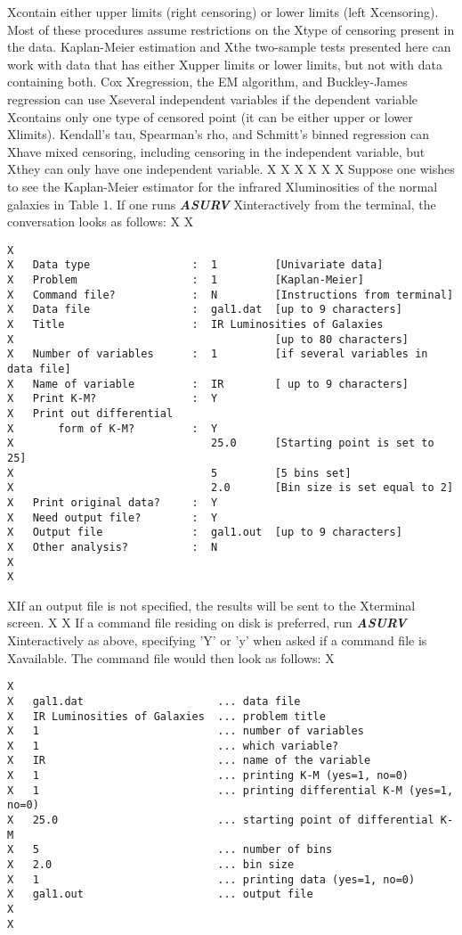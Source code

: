 Xcontain either upper limits (right censoring) or lower limits (left 
Xcensoring).  Most of these procedures assume restrictions on the 
Xtype of censoring present in the data.  Kaplan-Meier estimation and 
Xthe two-sample tests presented here can work with data that has either 
Xupper limits or lower limits, but not with data containing both.  Cox 
Xregression, the EM algorithm, and Buckley-James regression can use 
Xseveral independent variables if the dependent variable 
Xcontains only one type of censored point (it can be either upper or lower 
Xlimits).  Kendall's tau, Spearman's rho, and Schmitt's binned regression can 
Xhave mixed censoring, including censoring in the independent variable, but 
Xthey can only have one independent variable.
X
X\bigskip
X\bigskip
X
X 
X     Suppose one wishes to see the Kaplan-Meier estimator for the infrared
Xluminosities of the normal galaxies in Table 1. If one runs {\sl\bf ASURV}
Xinteractively from the terminal, the conversation looks as follows:
X
X\begin{verbatim}
X
X   Data type                :  1         [Univariate data]
X   Problem                  :  1         [Kaplan-Meier]
X   Command file?            :  N         [Instructions from terminal]
X   Data file                :  gal1.dat  [up to 9 characters]
X   Title                    :  IR Luminosities of Galaxies
X                                         [up to 80 characters]
X   Number of variables      :  1         [if several variables in data file] 
X   Name of variable         :  IR        [ up to 9 characters]
X   Print K-M?               :  Y
X   Print out differential
X       form of K-M?         :  Y
X                               25.0      [Starting point is set to 25]
X                               5         [5 bins set]
X                               2.0       [Bin size is set equal to 2]
X   Print original data?     :  Y
X   Need output file?        :  Y
X   Output file              :  gal1.out  [up to 9 characters]
X   Other analysis?          :  N
X
X\end{verbatim}
XIf an output file is not specified, the results will be sent to the 
Xterminal screen.
X 
X     If a command file residing on disk is preferred, run {\sl\bf ASURV}
Xinteractively as above, specifying 'Y' or 'y' when asked if a command file is
Xavailable. The command file would then look as follows:
X\begin{verbatim}
X 
X   gal1.dat                     ... data file                      
X   IR Luminosities of Galaxies  ... problem title                         
X   1                            ... number of variables    
X   1                            ... which variable?
X   IR                           ... name of the variable        
X   1                            ... printing K-M (yes=1, no=0) 
X   1                            ... printing differential K-M (yes=1, no=0)
X   25.0                         ... starting point of differential K-M
X   5                            ... number of bins
X   2.0                          ... bin size
X   1                            ... printing data (yes=1, no=0)
X   gal1.out                     ... output file              
X
X\end{verbatim}
